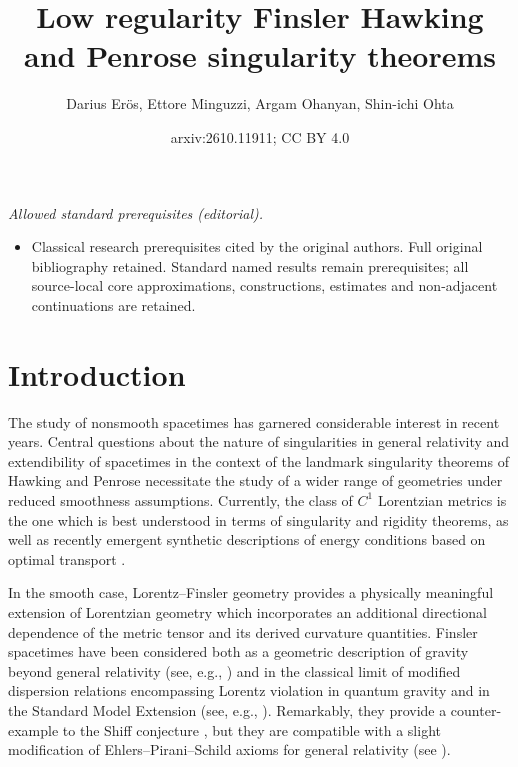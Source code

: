 \documentclass[a4paper,11pt]{article}
\title{Low regularity Finsler Hawking and Penrose singularity theorems}
\author{Darius Erös, Ettore Minguzzi, Argam Ohanyan, Shin-ichi Ohta}
\date{arxiv:2610.11911; CC BY 4.0}
\numberwithin{equation}{section}
\theoremstyle{definition}
\theoremstyle{plain}
\begin{document}
\maketitle
\noindent\textit{Allowed standard prerequisites (editorial).}\begin{itemize}
\item Classical research prerequisites cited by the original authors. Full original bibliography retained. Standard named results remain prerequisites; all source-local core approximations, constructions, estimates and non-adjacent continuations are retained.
\end{itemize}\medskip
\section{Introduction}

The study of nonsmooth spacetimes has garnered considerable interest in recent years. 
Central questions about the nature of singularities in general relativity and extendibility of spacetimes in the context of the landmark singularity theorems of Hawking and Penrose necessitate the study of a wider range of geometries under reduced smoothness assumptions. 
Currently, the class of $C^1$ Lorentzian metrics is the one which is best understood in terms of singularity \cite{Graf-SingularityC1, KOSS, SchinnerlSteinbauer} and rigidity \cite{KOV, quintetnonsmooth} theorems, as well as recently emergent synthetic descriptions of energy conditions based on optimal transport \cite{BraunCalisti}.

In the smooth case, Lorentz--Finsler geometry provides a physically meaningful extension of Lorentzian geometry which incorporates an additional directional dependence of the metric tensor and its derived curvature quantities. 
Finsler spacetimes have been considered both as a 
geometric description of gravity beyond general relativity (see, e.g., \cite{BeJaSa20, KoStSt09, Pfeife19}) and in the classical limit of modified dispersion relations
encompassing Lorentz violation in quantum gravity and in the Standard Model Extension (see, e.g., \cite{GiLiSi06, Vacaru11, Kostel11, KoRuTs12, Russel15, Collad17}). 
Remarkably, they provide a counter-example to the Shiff conjecture \cite{LaPeHa12}, but they are compatible with a slight modification of Ehlers--Pirani--Schild axioms for general relativity (see \cite{LaePer18, BeJaSa20}). 
\end{document}
